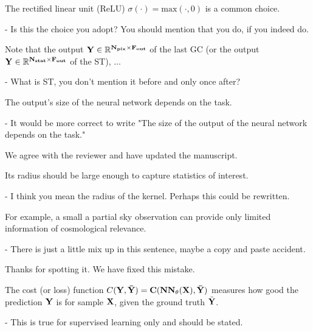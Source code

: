 \documentclass[12pt,a4paper]{article}
\newcommand{\nati}[1]{{\color[rgb]{.1,.6,.1}{NP: #1}}}
\newcommand{\todo}[1]{{\color[rgb]{.6,.1,.6}{TODO: #1}}}
\newcommand{\1}{\b{1}}              %
\newcommand{\0}{\b{0}}              %
\begin{document}
\begin{mdframed}[style=comment] 
The rectified linear unit (ReLU) $\sigma(\cdot) = \textrm{max}(\cdot, 0)$ is a common choice.

- Is this the choice you adopt? You should mention that you do, if you indeed do.
\end{mdframed}
\todo{Assigned: @michael}

\begin{mdframed}[style=comment] 
Note that the output $\bf{Y}\in\mathbb{R}^{N_{pix}\times F_{out}}$ of the last GC (or the output $\bf{Y}\in\mathbb{R}^{N_{stat}\times F_{out}}$ of the ST), ...

- What is ST, you don't mention it before and only once after?
\end{mdframed}
\todo{Assigned: @michael}

\begin{mdframed}[style=comment] 
The output’s size of the neural network depends on the task.

- It would be more correct to write "The size of the output of the neural network depends on the task."
\end{mdframed}
We agree with the reviewer and have updated the manuscript.

\begin{mdframed}[style=comment] 
Its radius should be large enough to capture statistics of interest.

- I think you mean the radius of the kernel. Perhaps this could be rewritten.
\end{mdframed}
\todo{Assigned: @all}
\nati{The manuscript seems clear to me. But let me know if you think otherwise.}

\begin{mdframed}[style=comment] 
For example, a small a partial sky observation can provide only limited information of cosmological relevance.

- There is just a little mix up in this sentence, maybe a copy and paste accident.
\end{mdframed}
Thanks for spotting it. We have fixed this mistake.

\begin{mdframed}[style=comment] 
The cost (or loss) function $C(\bf{Y},\bar{\bf{Y}}) = C(NN_\theta(\bf{X}),\bar{\bf{Y}})$ measures how good the prediction $\bf{Y}$ is for sample $\bf{X}$, given the ground truth $\bar{\bf{Y}}$.

- This is true for supervised learning only and should be stated.
\end{mdframed}
\todo{Assigned: @michael, @nati}
\nati{In an unsupervised setting, this can just not be computed... Specifying it seems redundant to me.}
\end{document}
